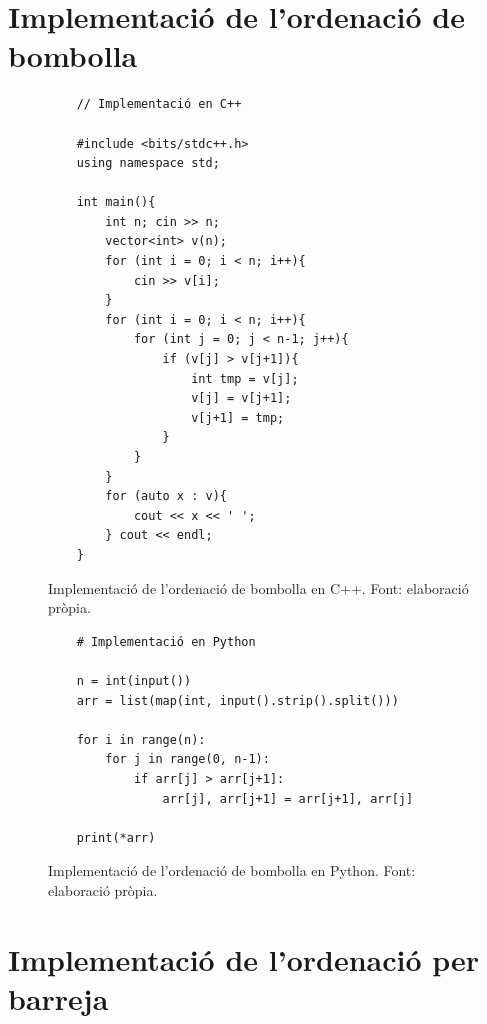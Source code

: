 \section{Implementació de l'ordenació de bombolla}
\begin{figure}[H]
    \begin{verbatim}
    // Implementació en C++
    
    #include <bits/stdc++.h>
    using namespace std;
    
    int main(){
        int n; cin >> n;
        vector<int> v(n);
        for (int i = 0; i < n; i++){
            cin >> v[i];
        }
        for (int i = 0; i < n; i++){
            for (int j = 0; j < n-1; j++){
                if (v[j] > v[j+1]){
                    int tmp = v[j];
                    v[j] = v[j+1];
                    v[j+1] = tmp;
                }
            }
        }
        for (auto x : v){
            cout << x << ' ';
        } cout << endl;
    }
    \end{verbatim}
    \caption[Implementació de l'ordenació de bombolla en C++.]{Implementació de l'ordenació de bombolla en C++. Font: elaboració pròpia.}
    \label{Figura}
\end{figure}
\begin{figure}[H]
    \begin{verbatim}
    # Implementació en Python
    
    n = int(input())
    arr = list(map(int, input().strip().split()))
    
    for i in range(n):
        for j in range(0, n-1):
            if arr[j] > arr[j+1]:
                arr[j], arr[j+1] = arr[j+1], arr[j]
    
    print(*arr)
    \end{verbatim}
    \caption[Implementació de l'ordenació de bombolla en Python.]{Implementació de l'ordenació de bombolla en Python. Font: elaboració pròpia.}
    \label{Figura}
\end{figure}

\section{Implementació de l'ordenació per barreja}

